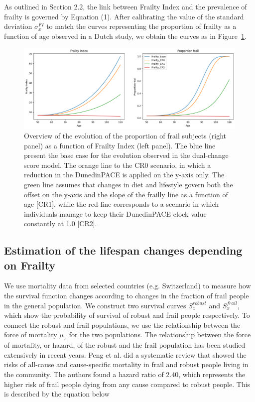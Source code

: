 As outlined in Section 2.2, the link between Frailty Index and the prevalence of frailty is governed by Equation (1). After calibrating the value of the standard deviation $\sigma_{x}^{FI}$ to match the curves representing the proportion of frailty as a function of age observed in a Dutch study\cite{Hoogendijk2019}, we obtain the curves as in Figure~\ref{fig:frailty_proportion}.

\begin{figure}[h]
\centering
\includegraphics[width=\textwidth]{figures/Figure4.png}
\caption{Overview of the evolution of the proportion of frail subjects (right panel) as a function of Frailty Index (left panel). The blue line present the base case for the evolution observed in the dual-change score model\cite{Mak2023}. The orange line to the CR0 scenario, in which a reduction in the DunedinPACE is applied on the y-axis only. The green line assumes that changes in diet and lifestyle govern both the offset on the y-axis and the slope of the frailly line as a function of age [CR1], while the red line corresponds to a scenario in which individuals manage to keep their DunedinPACE clock value constantly at 1.0 [CR2].}
\label{fig:frailty_proportion}
\end{figure}

\subsection{Estimation of the lifespan changes depending on Frailty}

We use mortality data from selected countries (e.g. Switzerland)\cite{Ruckstuhl2023} to measure how the survival function changes according to changes in the fraction of frail people in the general population. We construct two survival curves $S_{x}^{robust}$ and $S_{x}^{frail}$, which show the probability of survival of robust and frail people respectively. To connect the robust and frail populations, we use the relationship between the force of mortality $\mu_{x}$ for the two populations. The relationship between the force of mortality, or hazard, of the robust and the frail population has been studied extensively in recent years. Peng et al. did a systematic review that showed the risks of all-cause and cause-specific mortality in frail and robust people living in the community. The authors found a hazard ratio of 2.40, which represents the higher risk of frail people dying from any cause compared to robust people\cite{Peng2022}. This is described by the equation below

